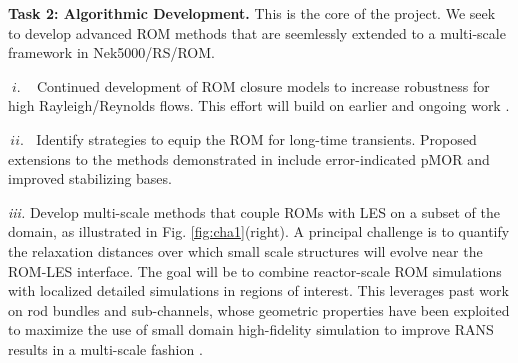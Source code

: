 

\noindent
\textbf{Task 2: Algorithmic Development.} This is the core of the project.
We seek to develop advanced ROM methods that are seemlessly
extended to a multi-scale framework in Nek5000/RS/ROM.
\\[-3ex]
\begin{description}
\item{$\; i. \; \; \;$}
Continued development of ROM closure models to increase robustness 
for high Rayleigh/Reynolds flows.  This effort will build on earlier and 
ongoing work
\cite{kaneko22a,kaneko22,tsai22a,kaneko20a,mou2021}.
\\[-3ex]
\item{$\, ii. \;\;$}
Identify strategies to equip the ROM for long-time transients.  
Proposed extensions to the methods demonstrated in \cite{kaneko20a}
include error-indicated pMOR and improved stabilizing bases.
\\[-3ex]
\item{\em iii. \;}Develop multi-scale methods that couple ROMs with LES on a 
subset of the domain, as illustrated in Fig. \ref{fig:cha1}(right).
A principal challenge is to quantify the relaxation distances over which small
scale structures will evolve near the ROM-LES interface. The goal will be to
combine reactor-scale ROM simulations with localized detailed simulations in
regions of interest. This leverages past work on rod bundles and sub-channels,
whose geometric properties have been exploited to maximize the use of small
domain high-fidelity simulation to improve RANS results in a multi-scale
fashion \cite{martinez2019a}.  
\\[-2ex]
\end{description}%

